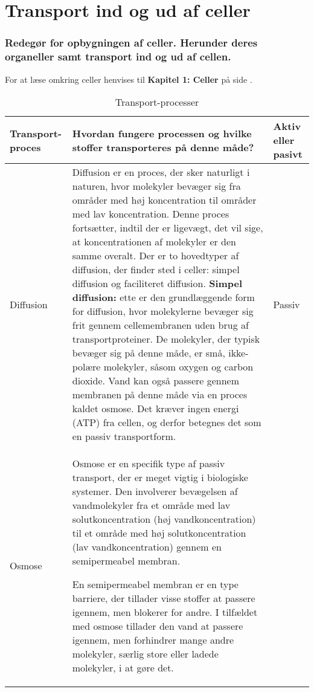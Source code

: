 \newpage
\part{Transport ind og ud af celler}
    \section{Redegør for opbygningen af celler. Herunder deres organeller samt transport ind og ud af cellen.}
        For at læse omkring celler henvises til \textbf{Kapitel 1: Celler} på side \pageref{sec:celletyperogderesorganeller}.
        \begin{center}
            \begin{longtable}{ | m{2cm} | m{11cm}| m{2cm} |}
                \caption{Transport-processer} \\
                \hline
                \textbf{Transport-proces} & \textbf{Hvordan fungere processen og hvilke stoffer transporteres på denne måde?} & \textbf{Aktiv eller pasivt}\\
                \hline
                Diffusion & Diffusion er en proces, der sker naturligt i naturen, hvor molekyler bevæger sig fra områder med høj koncentration til områder med lav koncentration. 
                Denne proces fortsætter, indtil der er ligevægt, det vil sige, at koncentrationen af molekyler er den samme overalt. Der er to hovedtyper af diffusion, der finder sted i celler: 
                simpel diffusion og faciliteret diffusion. \textbf{Simpel diffusion:}  ette er den grundlæggende form for diffusion, hvor molekylerne bevæger sig frit gennem cellemembranen uden brug af transportproteiner. 
                De molekyler, der typisk bevæger sig på denne måde, er små, ikke-polære molekyler, såsom oxygen og carbon dioxide. Vand kan også passere gennem membranen på denne måde via en proces kaldet osmose. Det kræver ingen energi (ATP) fra cellen, og derfor betegnes det som en passiv transportform. & Passiv\\
                \hline
                Osmose & Osmose er en specifik type af passiv transport, der er meget vigtig i biologiske systemer. Den involverer bevægelsen af vandmolekyler fra et område med lav solutkoncentration (høj vandkoncentration) til et område med høj solutkoncentration (lav vandkoncentration) gennem en semipermeabel membran.

                En semipermeabel membran er en type barriere, der tillader visse stoffer at passere igennem, men blokerer for andre. I tilfældet med osmose tillader den vand at passere igennem, men forhindrer mange andre molekyler, særlig store eller ladede molekyler, i at gøre det.
                

\end{longtable}
\end{center}
